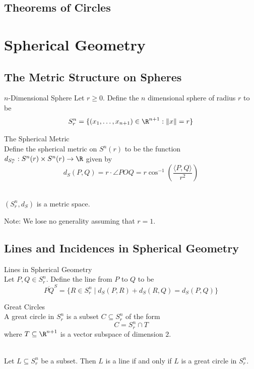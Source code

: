 \documentclass[a4paper]{article}
\begin{document}
\subsection{Theorems of Circles}

\pagebreak
\section{Spherical Geometry}
\subsection{The Metric Structure on Spheres}
\begin{defn}{$n$-Dimensional Sphere}{} Let $r\geq 0$. Define the $n$ dimensional sphere of radius $r$ to be $$S_r^n=\{(x_1,\dots,x_{n+1})\in\R^{n+1}:\|x\|=r\}$$
\end{defn}

\begin{defn}{The Spherical Metric}{}\\
Define the spherical metric on $S^n(r)$ to be the function $d_{S_r^n}:S^n(r)\times S^n(r)\to\R$ given by $$d_S(P,Q)=r\cdot\angle POQ=r\cos^{-1}\left(\frac{\langle P,Q\rangle}{r^2}\right)$$
\end{defn}

\begin{prp}{}{}\\
$(S_r^n,d_S)$ is a metric space. 
\end{prp}

Note: We lose no generality assuming that $r=1$. 

\subsection{Lines and Incidences in Spherical Geometry}
\begin{defn}{Lines in Spherical Geometry}{}\\
Let $P,Q\in S_r^n$. Define the line from $P$ to $Q$ to be $$\overline{PQ}^S=\{R\in S_r^n\;|\;d_S(P,R)+d_S(R,Q)=d_S(P,Q)\}$$
\end{defn}

\begin{defn}{Great Circles}{}\\
A great circle in $S_r^n$ is a subset $C\subseteq S_r^n$ of the form $$C=S_r^n\cap T$$ where $T\subseteq\R^{n+1}$ is a vector subspace of dimension $2$. 
\end{defn}

\begin{prp}{}{}\\
Let $L\subseteq S_r^n$ be a subset. Then $L$ is a line if and only if $L$ is a great circle in $S_r^n$. 
\end{prp}
\end{document}
